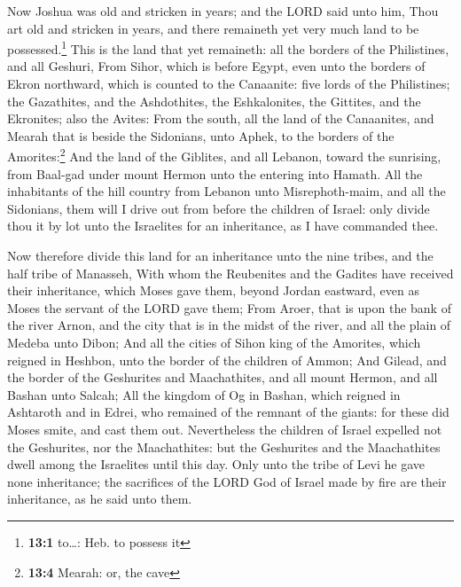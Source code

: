  Now Joshua was old and stricken in years; and the LORD
said unto him, Thou art old and stricken in years, and there remaineth
yet very much land to be possessed.\footnote{\textbf{13:1} to\ldots:
  Heb. to possess it}  This is the land that yet
remaineth: all the borders of the Philistines, and all Geshuri,
 From Sihor, which is before Egypt, even unto the borders
of Ekron northward, which is counted to the Canaanite: five lords of the
Philistines; the Gazathites, and the Ashdothites, the Eshkalonites, the
Gittites, and the Ekronites; also the Avites:  From the
south, all the land of the Canaanites, and Mearah that is beside the
Sidonians, unto Aphek, to the borders of the Amorites:\footnote{\textbf{13:4}
  Mearah: or, the cave}  And the land of the Giblites, and
all Lebanon, toward the sunrising, from Baal-gad under mount Hermon unto
the entering into Hamath.  All the inhabitants of the hill
country from Lebanon unto Misrephoth-maim, and all the Sidonians, them
will I drive out from before the children of Israel: only divide thou it
by lot unto the Israelites for an inheritance, as I have commanded thee.

 Now therefore divide this land for an inheritance unto
the nine tribes, and the half tribe of Manasseh,  With
whom the Reubenites and the Gadites have received their inheritance,
which Moses gave them, beyond Jordan eastward, even as Moses the servant
of the LORD gave them;  From Aroer, that is upon the bank
of the river Arnon, and the city that is in the midst of the river, and
all the plain of Medeba unto Dibon;  And all the cities
of Sihon king of the Amorites, which reigned in Heshbon, unto the border
of the children of Ammon;  And Gilead, and the border of
the Geshurites and Maachathites, and all mount Hermon, and all Bashan
unto Salcah;  All the kingdom of Og in Bashan, which
reigned in Ashtaroth and in Edrei, who remained of the remnant of the
giants: for these did Moses smite, and cast them out. 
Nevertheless the children of Israel expelled not the Geshurites, nor the
Maachathites: but the Geshurites and the Maachathites dwell among the
Israelites until this day.  Only unto the tribe of Levi
he gave none inheritance; the sacrifices of the LORD God of Israel made
by fire are their inheritance, as he said unto them.

